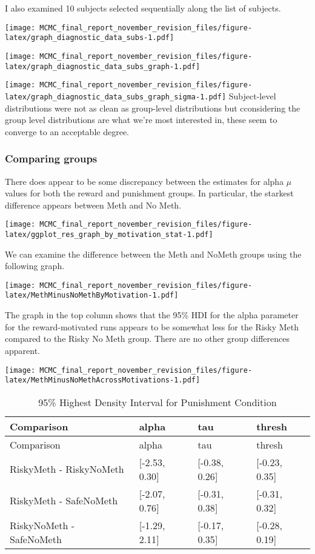\documentclass[]{article}
\begin{document}
I also examined 10 subjects selected sequentially along the list of
subjects.

\texttt{[image: MCMC\_final\_report\_november\_revision\_files/figure-latex/graph\_diagnostic\_data\_subs-1.pdf]}

\texttt{[image: MCMC\_final\_report\_november\_revision\_files/figure-latex/graph\_diagnostic\_data\_subs\_graph-1.pdf]}

\texttt{[image: MCMC\_final\_report\_november\_revision\_files/figure-latex/graph\_diagnostic\_data\_subs\_graph\_sigma-1.pdf]}
Subject-level distributions were not as clean as group-level
distributions but cconsidering the group level distributions are what
we're most interested in, these seem to converge to an acceptable
degree.

\subsubsection{Comparing groups}\label{comparing-groups}

There does appear to be some discrepancy between the estimates for alpha
\(\mu\) values for both the reward and punishment groups. In particular,
the starkest difference appears between Meth and No Meth.

\texttt{[image: MCMC\_final\_report\_november\_revision\_files/figure-latex/ggplot\_res\_graph\_by\_motivation\_stat-1.pdf]}

We can examine the difference between the Meth and NoMeth groups using
the following graph.

\texttt{[image: MCMC\_final\_report\_november\_revision\_files/figure-latex/MethMinusNoMethByMotivation-1.pdf]}

The graph in the top column shows that the 95\% HDI for the alpha
parameter for the reward-motivated runs appears to be somewhat less for
the Risky Meth compared to the Risky No Meth group. There are no other
group differences apparent.

\texttt{[image: MCMC\_final\_report\_november\_revision\_files/figure-latex/MethMinusNoMethAcrossMotivations-1.pdf]}

\begin{longtable}[]{@{}llll@{}}
\caption{95\% Highest Density Interval for Punishment
Condition}\tabularnewline
\toprule
Comparison & alpha & tau & thresh\tabularnewline
\midrule
\endfirsthead
\toprule
Comparison & alpha & tau & thresh\tabularnewline
\midrule
\endhead
RiskyMeth - RiskyNoMeth & {[}-2.53, 0.30{]} & {[}-0.38, 0.26{]} &
{[}-0.23, 0.35{]}\tabularnewline
RiskyMeth - SafeNoMeth & {[}-2.07, 0.76{]} & {[}-0.31, 0.38{]} &
{[}-0.31, 0.32{]}\tabularnewline
RiskyNoMeth - SafeNoMeth & {[}-1.29, 2.11{]} & {[}-0.17, 0.35{]} &
{[}-0.28, 0.19{]}\tabularnewline
\bottomrule
\end{longtable}
\end{document}
